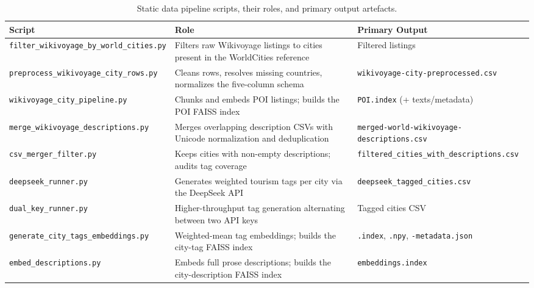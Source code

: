 \documentclass[12pt,a4paper]{report}
\begin{document}
\begin{appendices}
\begin{table}[H]
\centering
\small
\renewcommand{\arraystretch}{1.3}
\begin{tabularx}{\textwidth}{
    >{\raggedright\arraybackslash}p{4.5cm}
    >{\raggedright\arraybackslash}X
    >{\raggedright\arraybackslash}p{3.1cm}}
\toprule
\textbf{Script} & \textbf{Role} & \textbf{Primary Output} \\
\midrule
\texttt{filter\_\allowbreak wikivoyage\_\allowbreak by\_\allowbreak world\_\allowbreak cities.py} & Filters raw Wikivoyage listings to cities present in the WorldCities reference & Filtered listings \\
\texttt{preprocess\_\allowbreak wikivoyage\_\allowbreak city\_\allowbreak rows.py} & Cleans rows, resolves missing countries, normalizes the five-column schema & \texttt{wikivoyage-\allowbreak city-\allowbreak preprocessed.csv} \\
\texttt{wikivoyage\_\allowbreak city\_\allowbreak pipeline.py} & Chunks and embeds POI listings; builds the POI FAISS index & \texttt{POI.index} (+ texts/metadata) \\
\texttt{merge\_\allowbreak wikivoyage\_\allowbreak descriptions.py} & Merges overlapping description CSVs with Unicode normalization and deduplication & \texttt{merged-\allowbreak world-\allowbreak wikivoyage-\allowbreak descriptions.csv} \\
\texttt{csv\_\allowbreak merger\_\allowbreak filter.py} & Keeps cities with non-empty descriptions; audits tag coverage & \texttt{filtered\_\allowbreak cities\_\allowbreak with\_\allowbreak descriptions.csv} \\
\texttt{deepseek\_\allowbreak runner.py} & Generates weighted tourism tags per city via the DeepSeek API & \texttt{deepseek\_\allowbreak tagged\_\allowbreak cities.csv} \\
\texttt{dual\_\allowbreak key\_\allowbreak runner.py} & Higher-throughput tag generation alternating between two API keys & Tagged cities CSV \\
\texttt{generate\_\allowbreak city\_\allowbreak tags\_\allowbreak embeddings.py} & Weighted-mean tag embeddings; builds the city-tag FAISS index & \texttt{.index}, \texttt{.npy}, \texttt{-metadata.json} \\
\texttt{embed\_\allowbreak descriptions.py} & Embeds full prose descriptions; builds the city-description FAISS index & \texttt{embeddings.index} \\
\bottomrule
\end{tabularx}
\caption{Static data pipeline scripts, their roles, and primary output artefacts.}
\label{tab:static-scripts}
\end{table}


\end{appendices}
\end{document}
